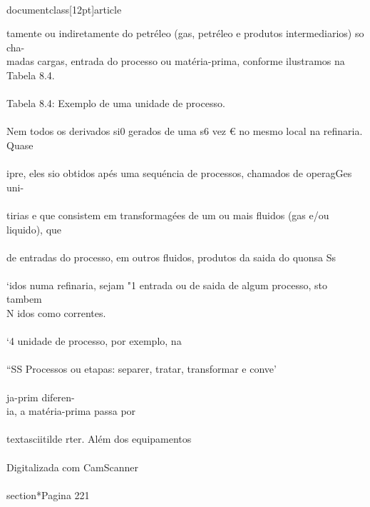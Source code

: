 \\documentclass[12pt]{article}
\begin{document}
tamente ou indiretamente do petréleo (gas, petréleo e produtos intermediarios) so cha-\\
madas cargas, entrada do processo ou matéria-prima, conforme ilustramos na Tabela 8.4.\\
\\
Tabela 8.4: Exemplo de uma unidade de processo.\\
\\
Nem todos os derivados si0 gerados de uma s6 vez € no mesmo local na refinaria. Quase\\
\\
ipre, eles sio obtidos apés uma sequéncia de processos, chamados de operagGes uni-\\
\\
tirias e que consistem em transformagées de um ou mais fluidos (gas e/ou liquido), que\\
\\
de entradas do processo, em outros fluidos, produtos da saida do quonsa Ss\\
\\
‘idos numa refinaria, sejam "1 entrada ou de saida de algum processo, sto tambem\\
N idos como correntes.\\
\\
‘4 unidade de processo, por exemplo, na\\
\\
“SS Processos ou etapas: separer, tratar, transformar e conve’\\
\\
ja-prim diferen-\\
ia, a matéria-prima passa por\\
\\textasciitilde{} rter. Além dos equipamentos\\
\\
Digitalizada com CamScanner\\

\\section*{Pagina 221}
\end{document}
